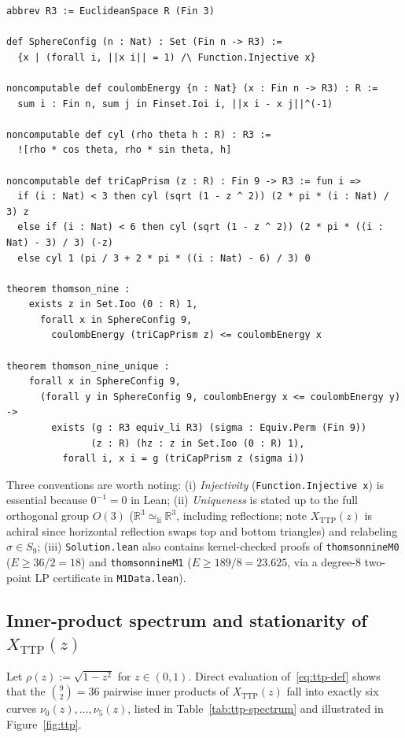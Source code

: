 \documentclass[11pt,reqno]{amsart}
\renewcommand{\_}{\origunderscore\allowbreak}
\theoremstyle{definition}
\newcommand{\R}{\mathbb{R}}
\newcommand{\TTP}{X_{\mathrm{TTP}}}
\begin{document}
\begin{lstlisting}[float=htbp,caption={Formal definitions and main theorems in \texttt{ThomsonN9/Solution.lean} (ASCII transliteration; checked verbatim against \texttt{ComparatorChallenges/\allowbreak ThomsonN9.lean}).},label={lst:lean-stmt}]
abbrev R3 := EuclideanSpace R (Fin 3)

def SphereConfig (n : Nat) : Set (Fin n -> R3) :=
  {x | (forall i, ||x i|| = 1) /\ Function.Injective x}

noncomputable def coulombEnergy {n : Nat} (x : Fin n -> R3) : R :=
  sum i : Fin n, sum j in Finset.Ioi i, ||x i - x j||^(-1)

noncomputable def cyl (rho theta h : R) : R3 :=
  ![rho * cos theta, rho * sin theta, h]

noncomputable def triCapPrism (z : R) : Fin 9 -> R3 := fun i =>
  if (i : Nat) < 3 then cyl (sqrt (1 - z ^ 2)) (2 * pi * (i : Nat) / 3) z
  else if (i : Nat) < 6 then cyl (sqrt (1 - z ^ 2)) (2 * pi * ((i : Nat) - 3) / 3) (-z)
  else cyl 1 (pi / 3 + 2 * pi * ((i : Nat) - 6) / 3) 0

theorem thomson_nine :
    exists z in Set.Ioo (0 : R) 1,
      forall x in SphereConfig 9,
        coulombEnergy (triCapPrism z) <= coulombEnergy x

theorem thomson_nine_unique :
    forall x in SphereConfig 9,
      (forall y in SphereConfig 9, coulombEnergy x <= coulombEnergy y) ->
        exists (g : R3 equiv_li R3) (sigma : Equiv.Perm (Fin 9))
               (z : R) (hz : z in Set.Ioo (0 : R) 1),
          forall i, x i = g (triCapPrism z (sigma i))
\end{lstlisting}

Three conventions are worth noting:
(i) \emph{Injectivity} (\texttt{Function.Injective x}) is essential because $0^{-1} = 0$ in Lean;
(ii) \emph{Uniqueness} is stated up to the full orthogonal group $O(3)$ ($\R^3 \simeq_{\mathrm{li}} \R^3$, including reflections; note $\TTP(z)$ is achiral since horizontal reflection swaps top and bottom triangles) and relabeling $\sigma \in S_9$;
(iii) \texttt{Solution.lean} also contains kernel-checked proofs of \texttt{thomson\_nine\_M0} ($E \ge 36/2 = 18$) and \texttt{thomson\_nine\_M1} ($E \ge 189/8 = 23.625$, via a degree-$8$ two-point LP certificate in \texttt{M1Data.lean}).

\subsection{Inner-product spectrum and stationarity of $\TTP(z)$}\label{subsec:ttp-geom}
Let $\rho(z) := \sqrt{1 - z^2}$ for $z \in (0,1)$. Direct evaluation of~\eqref{eq:ttp-def} shows that the $\binom{9}{2} = 36$ pairwise inner products of $\TTP(z)$ fall into exactly six curves $\nu_0(z),\dots,\nu_5(z)$, listed in Table~\ref{tab:ttp-spectrum} and illustrated in Figure~\ref{fig:ttp}.
\end{document}
